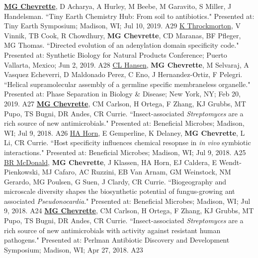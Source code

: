 
\begin{cvpubs}
  \cvpub
    {\underline{\textbf{MG Chevrette}}, D Acharya, A Hurley, M Beebe, M Garavito, S Miller, J Handelsman. ``Tiny Earth Chemistry Hub: From soil to antibiotics." Presented at: Tiny Earth Symposium; Madison, WI; Jul 10, 2019.} %
    {A29} %
  \cvpub
    {\underline{K Throckmorton}, V Vinnik, TB Cook, R Chowdhury, \textbf{MG Chevrette}, CD Maranas, BF Pfleger, MG Thomas. ``Directed evolution of an adenylation domain specificity code." Presented at: Synthetic Biology for Natural Products Conference; Puerto Vallarta, Mexico; Jun 2, 2019.} %
    {A28} %
  \cvpub
    {\underline{CL Hansen}, \textbf{MG Chevrette}, M Selvaraj, A Vasquez Echeverri, D Maldonado Perez, C Eno, J Hernandez-Ortiz, F Pelegri. ``Helical supramolecular assembly of a germline specific membraneless organelle." Presented at: Phase Separation in Biology \& Disease; New York, NY; Feb 20, 2019.} %
    {A27} %
  \cvpub
    {\underline{\textbf{MG Chevrette}}, CM Carlson, H Ortega, F Zhang, KJ Grubbs, MT Pupo, TS Bugni, DR Andes, CR Currie. ``Insect-associated \textit{Streptomyces} are a rich source of new antimicrobials." Presented at: Beneficial Microbes; Madison, WI; Jul 9, 2018.} %
    {A26} %
  \cvpub
    {\underline{HA Horn}, E Gemperline, K Delaney, \textbf{MG Chevrette}, L Li, CR Currie. ``Host specificity influences chemical resopnse in \textit{in vivo} symbiotic interactions." Presented at: Beneficial Microbes; Madison, WI; Jul 9, 2018.} %
    {A25} %
  \cvpub
    {\underline{BR McDonald}, \textbf{MG Chevrette}, J Klassen, HA Horn, EJ Caldera, E Wendt-Pienkowski, MJ Cafaro, AC Ruzzini, EB Van Arnam, GM Weinstock, NM Gerardo, MG Poulsen, G Suen, J Clardy, CR Currie. ``Biogeography and microscale diversity shapes the biosynthetic potential of fungus-growing ant associated \textit{Pseudonocardia}." Presented at: Beneficial Microbes; Madison, WI; Jul 9, 2018.} %
    {A24} %
  \cvpub
    {\underline{\textbf{MG Chevrette}}, CM Carlson, H Ortega, F Zhang, KJ Grubbs, MT Pupo, TS Bugni, DR Andes, CR Currie. ``Insect-associated \textit{Streptomyces} are a rich source of new antimicrobials with activity against resistant human pathogens." Presented at: Perlman Antibiotic Discovery and Development Symposium; Madison, WI; Apr 27, 2018.} %
    {A23} %

\end{cvpubs}
